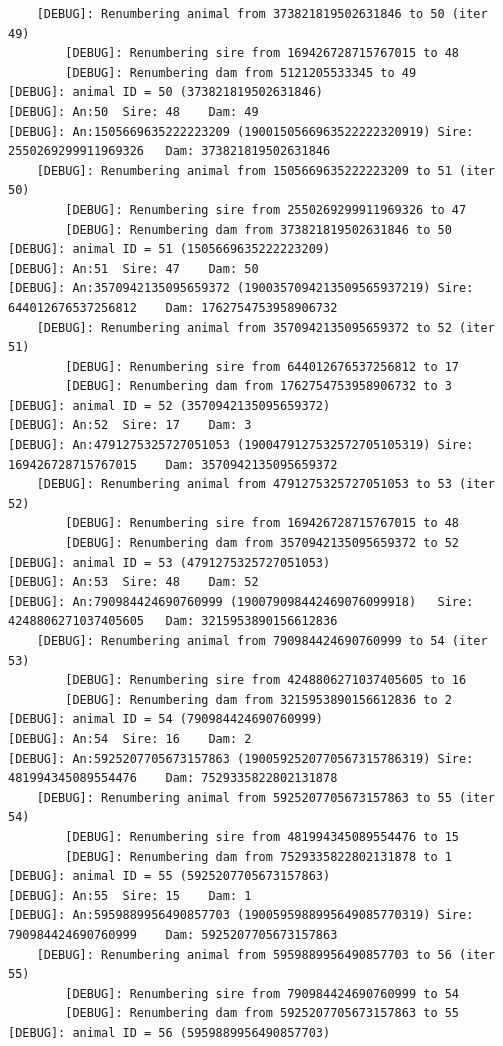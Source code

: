 \documentclass[
  letterpaper,
  DIV=11,
  numbers=noendperiod]{scrreprt}
\begin{document}
\begin{codelisting}
{\begin{verbatim}
    [DEBUG]: Renumbering animal from 373821819502631846 to 50 (iter 49)
        [DEBUG]: Renumbering sire from 169426728715767015 to 48
        [DEBUG]: Renumbering dam from 5121205533345 to 49
[DEBUG]: animal ID = 50 (373821819502631846)
[DEBUG]: An:50  Sire: 48    Dam: 49
[DEBUG]: An:1505669635222223209 (1900150566963522222320919) Sire: 2550269299911969326   Dam: 373821819502631846
    [DEBUG]: Renumbering animal from 1505669635222223209 to 51 (iter 50)
        [DEBUG]: Renumbering sire from 2550269299911969326 to 47
        [DEBUG]: Renumbering dam from 373821819502631846 to 50
[DEBUG]: animal ID = 51 (1505669635222223209)
[DEBUG]: An:51  Sire: 47    Dam: 50
[DEBUG]: An:3570942135095659372 (1900357094213509565937219) Sire: 644012676537256812    Dam: 1762754753958906732
    [DEBUG]: Renumbering animal from 3570942135095659372 to 52 (iter 51)
        [DEBUG]: Renumbering sire from 644012676537256812 to 17
        [DEBUG]: Renumbering dam from 1762754753958906732 to 3
[DEBUG]: animal ID = 52 (3570942135095659372)
[DEBUG]: An:52  Sire: 17    Dam: 3
[DEBUG]: An:4791275325727051053 (1900479127532572705105319) Sire: 169426728715767015    Dam: 3570942135095659372
    [DEBUG]: Renumbering animal from 4791275325727051053 to 53 (iter 52)
        [DEBUG]: Renumbering sire from 169426728715767015 to 48
        [DEBUG]: Renumbering dam from 3570942135095659372 to 52
[DEBUG]: animal ID = 53 (4791275325727051053)
[DEBUG]: An:53  Sire: 48    Dam: 52
[DEBUG]: An:790984424690760999 (190079098442469076099918)   Sire: 4248806271037405605   Dam: 3215953890156612836
    [DEBUG]: Renumbering animal from 790984424690760999 to 54 (iter 53)
        [DEBUG]: Renumbering sire from 4248806271037405605 to 16
        [DEBUG]: Renumbering dam from 3215953890156612836 to 2
[DEBUG]: animal ID = 54 (790984424690760999)
[DEBUG]: An:54  Sire: 16    Dam: 2
[DEBUG]: An:5925207705673157863 (1900592520770567315786319) Sire: 481994345089554476    Dam: 7529335822802131878
    [DEBUG]: Renumbering animal from 5925207705673157863 to 55 (iter 54)
        [DEBUG]: Renumbering sire from 481994345089554476 to 15
        [DEBUG]: Renumbering dam from 7529335822802131878 to 1
[DEBUG]: animal ID = 55 (5925207705673157863)
[DEBUG]: An:55  Sire: 15    Dam: 1
[DEBUG]: An:5959889956490857703 (1900595988995649085770319) Sire: 790984424690760999    Dam: 5925207705673157863
    [DEBUG]: Renumbering animal from 5959889956490857703 to 56 (iter 55)
        [DEBUG]: Renumbering sire from 790984424690760999 to 54
        [DEBUG]: Renumbering dam from 5925207705673157863 to 55
[DEBUG]: animal ID = 56 (5959889956490857703)

\end{verbatim}}
\end{codelisting}
\end{document}
